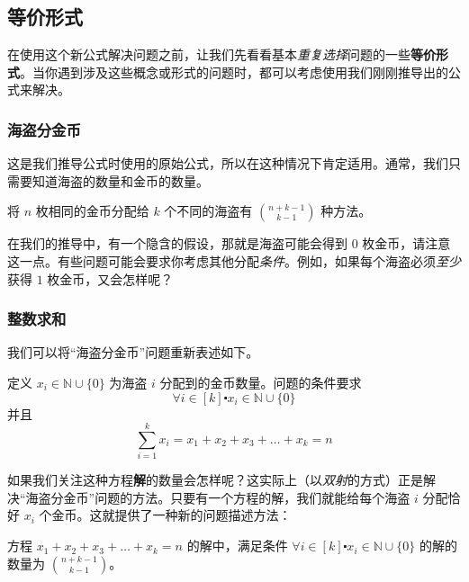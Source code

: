 
\subsection{等价形式}

在使用这个新公式解决问题之前，让我们先看看基本\emph{重复选择}问题的一些\textbf{等价形式}。当你遇到涉及这些概念或形式的问题时，都可以考虑使用我们刚刚推导出的公式来解决。

\subsubsection*{海盗分金币}

这是我们推导公式时使用的原始公式，所以在这种情况下肯定适用。通常，我们只需要知道海盗的数量和金币的数量。

\begin{tcolorbox}[colback=blue!10,
    colframe=blue,
    width=\textwidth,
    arc=2mm, auto outer arc,
    breakable,enhanced jigsaw,
    before upper={\parindent15pt\noindent},	]
    将 $n$ 枚相同的金币分配给 $k$ 个不同的海盗有 ${n+k-1 \choose k-1}$ 种方法。
\end{tcolorbox}

在我们的推导中，有一个隐含的假设，那就是海盗可能会得到 $0$ 枚金币，请注意这一点。有些问题可能会要求你考虑其他分配\emph{条件}。例如，如果每个海盗必须\emph{至少}获得 $1$ 枚金币，又会怎样呢？

\subsubsection*{整数求和}

我们可以将``海盗分金币''问题重新表述如下。

定义 $x_i \in \mathbb{N} \cup \{0\}$ 为海盗 $i$ 分配到的金币数量。问题的条件要求
\[\forall i \in [k] \centerdot x_i \in \mathbb{N} \cup \{0\}\]
并且
\[\sum_{i=1}^{k}x_i = x_1 + x_2 + x_3 + \dots + x_k = n\]

如果我们关注这种方程\textbf{解}的数量会怎样呢？这实际上（以\emph{双射}的方式）正是解决``海盗分金币''问题的方法。只要有一个方程的解，我们就能给每个海盗 $i$ 分配恰好 $x_i$ 个金币。这就提供了一种新的问题描述方法：

\begin{tcolorbox}[colback=blue!10,
    colframe=blue,
    width=\textwidth,
    arc=2mm, auto outer arc,
    breakable,enhanced jigsaw,
    before upper={\parindent15pt\noindent},	]
    方程 $x_1 + x_2 + x_3 + \dots + x_k = n$ 的解中，满足条件 $\forall i \in [k] \centerdot x_i \in \mathbb{N} \cup \{0\}$ 的解的数量为 ${n+k-1 \choose k-1}$。
\end{tcolorbox}

